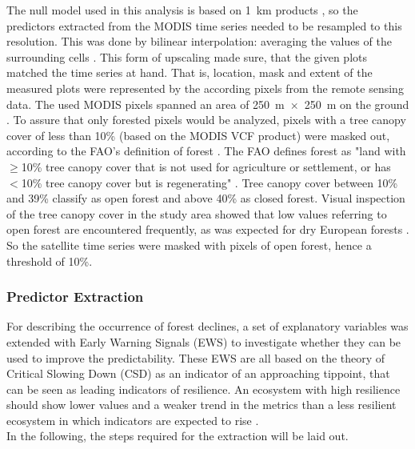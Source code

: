 The null model used in this analysis is based on 1~km products \citep{chaparro2017}, so the predictors extracted from the MODIS time series needed to be resampled to this resolution. This was done by bilinear interpolation: averaging the values of the surrounding cells \citep{bernstein1976}. This form of upscaling made sure, that the given plots matched the time series at hand. That is, location, mask and extent of the measured plots were represented by the according pixels from the remote sensing data. The used MODIS pixels spanned an area of 250~m~$\times$~250~m on the ground \citep{modisvcf}. To assure that only forested pixels would be analyzed, pixels with a tree canopy cover of less than 10\% (based on the MODIS VCF product) were masked out, according to the FAO's definition of forest \citep{faoforest}. The FAO defines forest as "land with $\geq$10\% tree canopy cover that is not used for agriculture or settlement, or has~$<$10\% tree canopy cover but is regenerating" \citep{bastin2017}. Tree canopy cover between 10\% and 39\% classify as open forest and above 40\% as closed forest. Visual inspection of the tree canopy cover in the study area showed that low values referring to open forest are encountered frequently, as was expected for dry European forests \citep{bastin2017}. So the satellite time series were masked with pixels of open forest, hence a threshold of 10\%.



\subsubsection{Predictor Extraction}
For describing the occurrence of forest declines, a set of explanatory variables was extended with Early Warning Signals (EWS) to investigate whether they can be used to improve the predictability. These EWS are all based on the theory of Critical Slowing Down (CSD) as an indicator of an approaching \gls{tippoint}, that can be seen as leading indicators of \gls{resilience}. An ecosystem with high \gls{resilience} should show lower values and a weaker trend in the metrics than a less resilient ecosystem in which indicators are expected to rise \citep{scheffer2001, scheffer2009a, carpenter2011a, dakos2012, dakos2014}.\\
In the following, the steps required for the extraction will be laid out.\\

